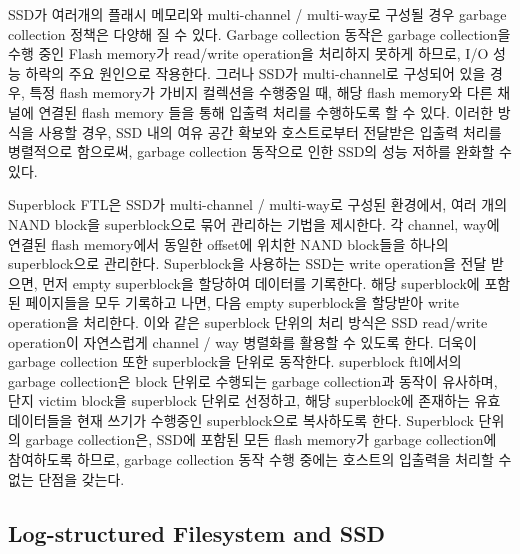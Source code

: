 \documentclass[letterpaper,twocolumn,10pt]{article}
\begin{document}
SSD가 여러개의 플래시 메모리와 multi-channel / multi-way로 구성될 경우 garbage collection 정책은 다양해 질 수 있다. Garbage collection 동작은 garbage collection을 수행 중인 Flash memory가 read/write operation을 처리하지 못하게 하므로, I/O 성능 하락의 주요 원인으로 작용한다. 그러나 SSD가 multi-channel로 구성되어 있을 경우, 특정 flash memory가 가비지 컬렉션을 수행중일 때, 해당 flash memory와 다른 채널에 연결된 flash memory 들을 통해 입출력 처리를 수행하도록 할 수 있다. 이러한 방식을 사용할 경우, SSD 내의 여유 공간 확보와 호스트로부터 전달받은 입출력 처리를 병렬적으로 함으로써, garbage collection 동작으로 인한 SSD의 성능 저하를 완화할 수 있다.

Superblock FTL\cite{kang2006superblock}은 SSD가 multi-channel / multi-way로 구성된 환경에서, 여러 개의 NAND block을 superblock으로 묶어 관리하는 기법을 제시한다. 각 channel, way에 연결된 flash memory에서 동일한 offset에 위치한 NAND block들을 하나의 superblock으로 관리한다. Superblock을 사용하는 SSD는 write operation을 전달 받으면, 먼저 empty superblock을 할당하여 데이터를 기록한다. 해당 superblock에 포함된 페이지들을 모두 기록하고 나면, 다음 empty superblock을 할당받아 write operation을 처리한다. 이와 같은 superblock 단위의 처리 방식은 SSD read/write operation이 자연스럽게 channel / way 병렬화를 활용할 수 있도록 한다. 더욱이 garbage collection 또한 superblock을 단위로 동작한다. superblock ftl에서의 garbage collection은 block 단위로 수행되는 garbage collection과 동작이 유사하며, 단지 victim block을 superblock 단위로 선정하고, 해당 superblock에 존재하는 유효 데이터들을 현재 쓰기가 수행중인 superblock으로 복사하도록 한다. Superblock 단위의 garbage collection은, SSD에 포함된 모든 flash memory가 garbage collection에 참여하도록 하므로, garbage collection 동작 수행 중에는 호스트의 입출력을 처리할 수 없는 단점을 갖는다.

\subsection{Log-structured Filesystem and SSD}
\end{document}
